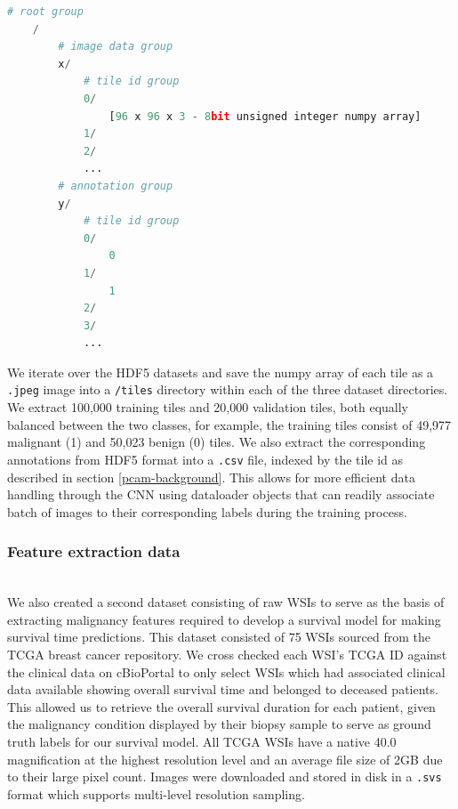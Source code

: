 \documentclass{l4proj}
\begin{document}
\begin{lstlisting}[language=python, caption={PCAM Data HDF5 schema - Each set has a group labeled 'x' - containing all the tiles as numpy arrays of 8-bit unsigned integers. Each array has a unique id (0, 1, 2...) and shape \(96 \times 96 \times 3\) indicating a \(96 \times 96\)px RGB tile. The second group labeled 'y' contains the annotations for each tile. The annotations are shown as binary labels against each tile id. }, label= lst:pcam-hdf5]
    # root group
    /
        # image data group
        x/
            # tile id group
            0/
                [96 x 96 x 3 - 8bit unsigned integer numpy array]
            1/
            2/
            ...
        # annotation group
        y/
            # tile id group
            0/
                0
            1/
                1
            2/
            3/
            ...
\end{lstlisting}

We iterate over the HDF5 datasets and save the numpy array of each tile as a \texttt{.jpeg} image into a \texttt{/tiles} directory within each of the three dataset directories. We extract 100,000 training tiles and 20,000 validation tiles, both equally balanced between the two classes, for example, the training tiles consist of 49,977 malignant (1) and 50,023 benign (0) tiles. We also extract the corresponding annotations from HDF5 format into a \texttt{.csv} file, indexed by the tile id as described in section \ref{pcam-background}. This allows for more efficient data handling through the CNN using dataloader objects that can readily associate batch of images to their corresponding labels during the training process. 

\subsubsection{Feature extraction data}\hfill\\
We also created a second dataset consisting of raw WSIs to serve as the basis of extracting malignancy features required to develop a survival model for making survival time predictions. This dataset consisted of 75 WSIs sourced from the TCGA breast cancer repository. We cross checked each WSI's TCGA ID against the clinical data on cBioPortal to only select WSIs which had associated clinical data available showing overall survival time and belonged to deceased patients. This allowed us to retrieve the overall survival duration for each patient, given the malignancy condition displayed by their biopsy sample to serve as ground truth labels for our survival model. All TCGA WSIs have a native 40.0 magnification at the highest resolution level and an average file size of 2GB due to their large pixel count. Images were downloaded and stored in disk in a \texttt{.svs} format which supports multi-level resolution sampling.  
\end{document}
